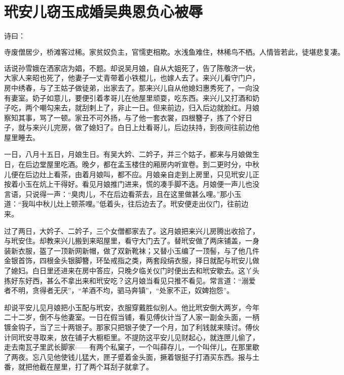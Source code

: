 

\chapter{玳安儿窃玉成婚\KG 吴典恩负心被辱}


诗曰：

\[
寺废僧居少，桥滩客过稀。家贫奴负主，官懦吏相欺。
水浅鱼难住，林稀鸟不栖。人情皆若此，徒堪悲复凄。
\]

话说孙雪娥在洒家店为娼，不题。却说吴月娘，自从大姐死了，告了陈敬济一状，大家人来昭也死了，他妻子一丈青带着小铁棍儿，也嫁人去了。来兴儿看守门户，房中绣春，与了王姑子做徒弟，出家去了。那来兴儿自从他媳妇惠秀死了，一向没有妻室。奶子如意儿，要便引着孝哥儿在他屋里顽耍，吃东西。来兴儿又打酒和奶子吃，两个嘲勾来去，就刮剌上了，非止一日。但来前边，归入后边就脸红。月娘察知其事，骂了一顿。家丑不可外扬，与了他一套衣裳，四根簪子，拣了个好日子，就与来兴儿完房，做了媳妇了。白日上灶看哥儿，后边扶持，到夜间往前边他屋里睡去。

一日，八月十五日，月娘生日。有吴大妗、二妗子，并三个姑子，都来与月娘做生日，在后边堂屋里吃酒。晚夕，都在孟玉楼住的厢房内听宣卷。到二更时分，中秋儿便在后边灶上看茶，由着月娘叫，都不应。月娘亲自走到上房里，只见玳安儿正按着小玉在炕上干得好。看见月娘推门进来，慌的凑手脚不迭。月娘便一声儿也没言语，只说得一声：“臭肉儿，不在后边看茶去，且在这里做甚么哩。”那小玉道：“我叫中秋儿灶上顿茶哩。”低着头，往后边去了。玳安便走出仪门，往前边来。

过了两日，大妗子、二妗子，三个女僧都家去了。这月娘把来兴儿房腾出收拾了，与玳安住。却教来兴儿搬到来昭屋里，看守大门去了。替玳安做了两床铺盖，一身装新衣服，盔了一顶新网新帽，做了双新靴袜；又替小玉编了一顶髻，与了他几件金银首饰，四根金头银脚簪，环坠戒指之类，两套段绢衣服，择日就配与玳安儿做了媳妇。白日里还进来在房中答应，只晚夕临关仪门时便出去和玳安歇去。这丫头拣好东好西，甚么不拿出来和玳安吃？这月娘当看见只推不看见。常言道：“溺爱者不明，贪得者无厌”，“羊酒不均，驷马奔镇”，“处家不正，奴婢抱怨”。

却说平安儿见月娘把小玉配与玳安，衣服穿戴胜似别人。他比玳安倒大两岁，今年二十二岁，倒不与他妻室。一日在假当铺，看见傅伙计当了人家一副金头面，一柄镀金钩子，当了三十两银子。那家只把银子使了一个月，加了利钱就来赎讨。傅伙计同玳安寻取来，放在铺子大橱柜里。不提防这平安儿见财起心，就连匣儿偷了，走去南瓦子里武长脚家——有两个私窠子，一个叫薛存儿，一个叫伴儿，在那里歇了两夜。忘八见他使钱儿猛大，匣子蹙着金头面，撅着银挺子打酒买东西。报与土番，就把他截在屋里，打了两个耳刮子就拿了。

